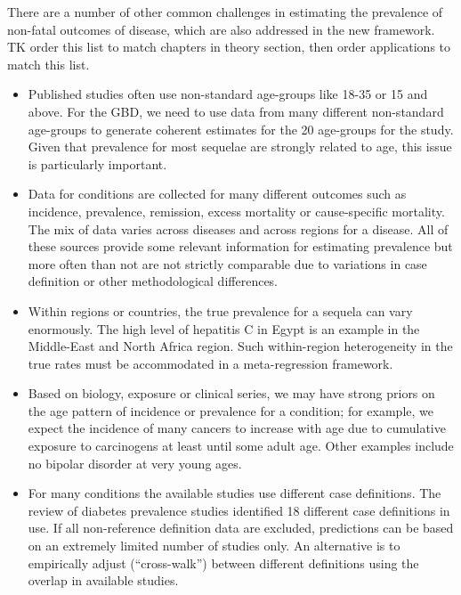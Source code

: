 There are a number of other common challenges in estimating the
prevalence of non-fatal outcomes of disease, which are also addressed
in the new framework. TK order this list to match chapters in theory section, then order applications to match this list.
\begin{itemize}
\item Published studies often use non-standard age-groups like 18-35
or 15 and above.  For the GBD, we need to use data from many different
non-standard age-groups to generate coherent estimates for the 20
age-groups for the study.  Given that prevalence for most sequelae are
strongly related to age, this issue is particularly important.

\item Data for conditions are collected for many different outcomes
such as incidence, prevalence, remission, excess mortality or
cause-specific mortality.  The mix of data varies across diseases and
across regions for a disease.  All of these sources provide some
relevant information for estimating prevalence but more often than not
are not strictly comparable due to variations in case definition or
other methodological differences.

\item Within regions or
countries, the true prevalence for a sequela can vary enormously. The
high level of hepatitis C in Egypt is an example in the Middle-East
and North Africa region.  Such within-region heterogeneity in the true
rates must be accommodated in a meta-regression framework.

\item Based on biology, exposure or clinical series, we may have strong
priors on the age pattern of incidence or prevalence for a condition;
for example, we expect the incidence of many cancers to increase with
age due to cumulative exposure to carcinogens at least until some
adult age.  Other examples include no bipolar disorder at very young
ages.  

\item For many conditions the available studies use
different case definitions.  The review of diabetes prevalence studies
identified 18 different case definitions in use.  If all non-reference
definition data are excluded, predictions can be based on an extremely
limited number of studies only.  An alternative is to empirically
adjust (“cross-walk”) between different definitions using the overlap
in available studies.
\end{itemize}

